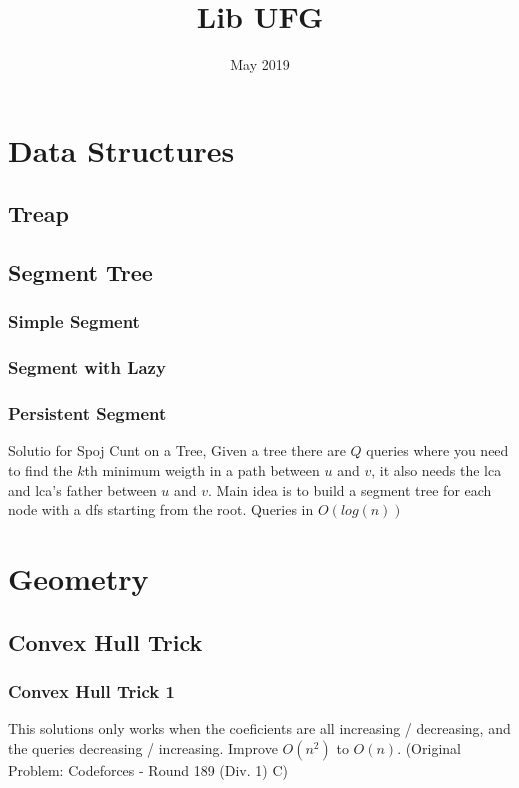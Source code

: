 \documentclass{report}
\title{Lib UFG}
\date{May 2019}
\newcommand{\RomanNumeralCaps}[1]
    {\MakeUppercase{\romannumeral #1}}
\begin{document}
\maketitle
 
 
\tableofcontents{}
    \chapter{Data Structures \RomanNumeralCaps{2}}
    \section{Treap}
    
    \newpage
    \section{Segment Tree}
    \subsection{Simple Segment}
    
    \newpage
    \subsection{Segment with Lazy}
    
    \newpage
    \subsection{Persistent Segment}
    Solutio for Spoj Cunt on a Tree,
    Given a tree there are $Q$ queries where you need to find the $k$th minimum weigth in a path between $u$ and $v$, it also needs the lca and lca's father between $u$ and $v$.\newline
    Main idea is to build a segment tree for each node with a dfs starting from the root.
    \newline 
    Queries in $O(log(n))$
    
    \chapter{Geometry \RomanNumeralCaps{8}}
    \section{Convex Hull Trick}
        \subsection{Convex Hull Trick 1}
        This solutions only works when the coeficients are all increasing / decreasing, and the queries decreasing / increasing. Improve $O(n^2)$ to $O(n)$. (Original Problem: Codeforces - Round 189 (Div. 1) C)
        
        \newpage
\end{document}
